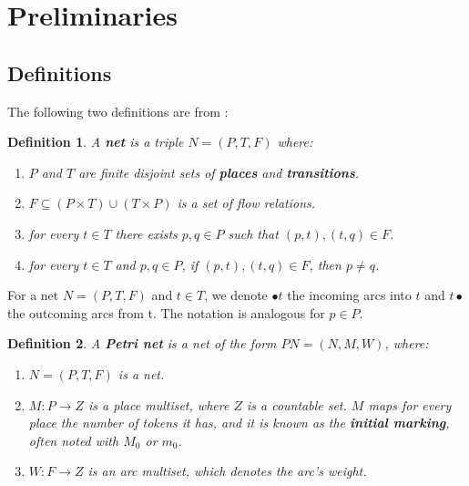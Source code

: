 \documentclass[12pt]{article}
\newtheorem{definition}{Definition}
\begin{document}
\section{Preliminaries}
    \subsection{Definitions}
    The following two definitions are from  \cite{rozenberg1996elementary}:
    \begin{definition}
        A \textbf{net} is a triple \(N=(P,T,F)\) where: 
        \begin{enumerate}
            \item \(P\) and \(T\) are finite disjoint sets of \textbf{places} and \textbf{transitions}.
            \item \(F \subseteq (P \times T)\cup(T \times P)\) is a set of flow relations.
            \item for every \(t \in T\) there exists $p,q \in P$ such that $(p,t),(t,q) \in F$.
            \item for every $t \in T$ and $p,q \in P$, if $(p,t),(t,q) \in F$, then $p \neq q$.
        \end{enumerate}
    \end{definition}

    For a net \(N=(P,T,F)\) and \(t \in T\), we denote $\bullet t$ the incoming arcs into $t$ and $t \bullet$ the outcoming arcs from t. The notation is analogous for $p \in P$.

    \begin{definition}
        A \textbf{Petri net} is a net of the form $PN=(N,M,W)$, where: 
        \begin{enumerate}
            \item $N=(P,T,F)$ is a net.
            \item \(M: P \rightarrow Z\) is a place multiset, where \(Z\) is a countable set. \(M\) maps for every place the number of tokens it has, and it is known as the \textbf{initial marking}, often noted with \(M_0\) or \(m_0\).
            \item \(W: F \rightarrow Z\) is an arc multiset, which denotes the arc's weight. 
        \end{enumerate}
    \end{definition}
\end{document}
